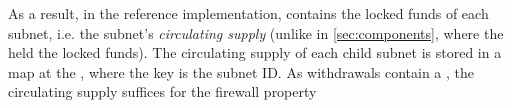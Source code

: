 
     As a result, in the reference implementation, \gw contains the locked funds of each subnet, i.e. the subnet's \textit{circulating supply} (unlike in \cref{sec:components}, where the \sa held the locked funds). The circulating supply of each child subnet is stored in a map at the \gw, where the key is the subnet ID. As withdrawals contain a \pof, the circulating supply suffices for the firewall property


